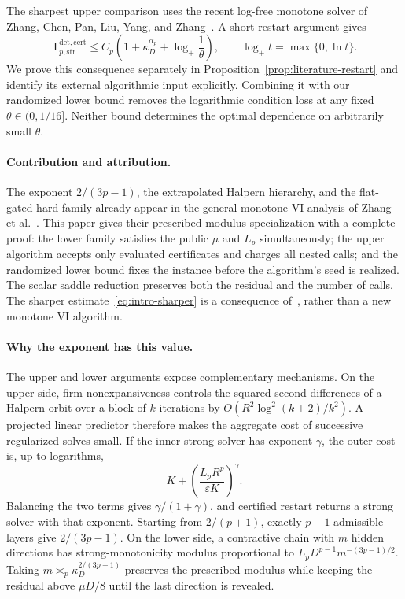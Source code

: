 \documentclass[11pt]{article}
\numberwithin{equation}{section}
\theoremstyle{definition}
\theoremstyle{remark}
\newcommand{\Tcert}{\mathsf T_{p,\mathrm{str}}^{\mathrm{det,cert}}}
\newcommand{\ap}{\alpha_p}
\newcommand{\logplus}{\log_{+}}
\begin{document}
The sharpest upper comparison uses the recent log-free monotone
solver of Zhang, Chen, Pan, Liu, Yang, and
Zhang~\cite[Theorem~5.1]{zhangchen2026}. A short restart argument gives
\begin{equation}\label{eq:intro-sharper}
\Tcert\le C_p\left(1+\kappa_D^{\ap}
+\logplus\frac1\theta\right),
\qquad \logplus t=\max\{0,\ln t\}.
\end{equation}
We prove this consequence separately in Proposition~\ref{prop:literature-restart}
and identify its external algorithmic input explicitly. Combining it with
our randomized lower bound removes the logarithmic condition loss at any
fixed $\theta\in(0,1/16]$. Neither bound determines the optimal dependence
on arbitrarily small $\theta$.

\paragraph{Contribution and attribution.}
The exponent $2/(3p-1)$, the extrapolated Halpern hierarchy, and the
flat-gated hard family already appear in the general monotone VI analysis
of Zhang et al.~\cite{zhang2026}. This paper gives their prescribed-modulus
specialization with a complete proof: the lower family satisfies the
public $\mu$ and $L_p$ simultaneously; the upper algorithm accepts only
evaluated certificates and charges all nested calls; and the randomized
lower bound fixes the instance before the algorithm's seed is realized.
The scalar saddle reduction preserves both the residual and the number
of calls. The sharper estimate~\eqref{eq:intro-sharper} is a consequence
of~\cite{zhangchen2026}, rather than a new monotone VI algorithm.

\paragraph{Why the exponent has this value.}
The upper and lower arguments expose complementary mechanisms. On the
upper side, firm nonexpansiveness controls the squared second differences
of a Halpern orbit over a block of $k$ iterations by
$O(R^2\log^2(k+2)/k^2)$. A projected linear predictor therefore makes the
aggregate cost of successive regularized solves small. If the inner
strong solver has exponent $\gamma$, the outer cost is, up to logarithms,
\[
K+\left(\frac{L_pR^p}{\varepsilon K}\right)^\gamma.
\]
Balancing the two terms gives $\gamma/(1+\gamma)$, and certified restart
returns a strong solver with that exponent. Starting from $2/(p+1)$,
exactly $p-1$ admissible layers give $2/(3p-1)$.
On the lower side, a contractive chain with $m$ hidden directions has
strong-monotonicity modulus proportional to
$L_pD^{p-1}m^{-(3p-1)/2}$. Taking
$m\asymp_p\kappa_D^{2/(3p-1)}$ preserves the prescribed modulus while
keeping the residual above $\mu D/8$ until the last direction is revealed.
\end{document}
